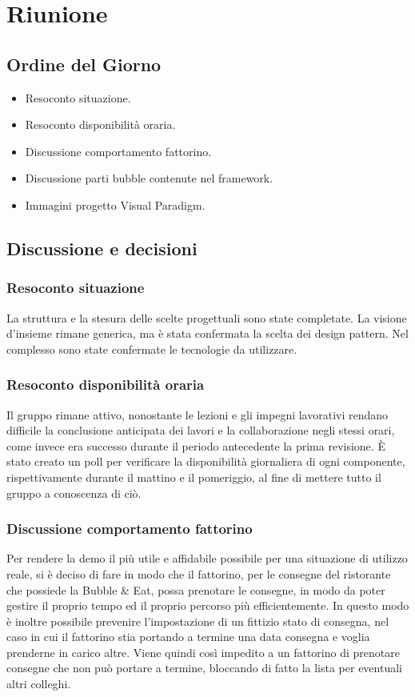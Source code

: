 \section{Riunione}
\subsection{Ordine del Giorno}
\begin{itemize}
	\item Resoconto situazione.
	\item Resoconto disponibilità oraria.
	\item Discussione comportamento fattorino.
	\item Discussione parti bubble contenute nel framework.
	\item Immagini progetto Visual Paradigm.
\end{itemize}

\subsection{Discussione e decisioni}

\subsubsection{Resoconto situazione}
La struttura e la stesura delle scelte progettuali sono state completate. La visione d'insieme rimane generica, ma è stata confermata la scelta dei design pattern. Nel complesso sono state confermate le tecnologie da utilizzare.

\subsubsection{Resoconto disponibilità oraria}
Il gruppo rimane attivo, nonostante le lezioni e gli impegni lavorativi rendano difficile la conclusione anticipata dei lavori e la collaborazione negli stessi orari, come invece era successo durante il periodo antecedente la prima revisione. È stato creato un poll per verificare la disponibilità giornaliera di ogni componente, rispettivamente durante il mattino e il pomeriggio, al fine di mettere tutto il gruppo a conoscenza di ciò.

\subsubsection{Discussione comportamento fattorino}
Per rendere la demo il più utile e affidabile possibile per una situazione di utilizzo reale, si è deciso di fare in modo che il fattorino, per le consegne del ristorante che possiede la Bubble \& Eat, possa prenotare le consegne, in modo da poter gestire il proprio tempo ed il proprio percorso più efficientemente. In questo modo è inoltre possibile prevenire l'impostazione di un fittizio stato di consegna, nel caso in cui il fattorino stia portando a termine una data consegna e voglia prenderne in carico altre. Viene quindi così impedito a un fattorino di prenotare consegne che non può portare a termine, bloccando di fatto la lista per eventuali altri colleghi.

